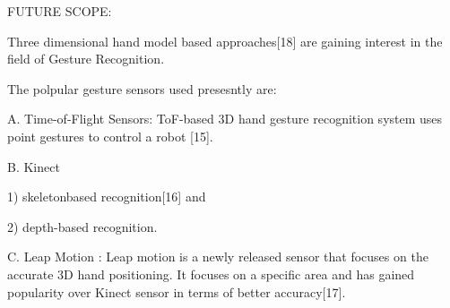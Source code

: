 \documentclass[conference]{IEEEtran}
\begin{document}
FUTURE SCOPE:

Three dimensional hand model based approaches[18] are gaining interest in the field of Gesture Recognition.



The polpular gesture sensors used presesntly are:

A. Time-of-Flight Sensors:
ToF-based 3D hand gesture recognition system uses point gestures to control a robot [15].

B. Kinect

 1) skeletonbased recognition[16] and 
 
 2) depth-based recognition.

C. Leap Motion : Leap motion is a newly released sensor that focuses on the accurate 3D hand positioning. It focuses on a specific area and has gained popularity over Kinect sensor in terms of better accuracy[17].


\end{document}
